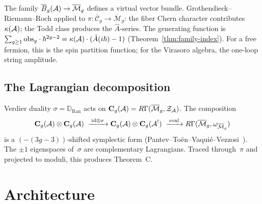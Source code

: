 The family $\overline{B}_g(\mathcal{A}) \to \overline{\mathcal{M}}_g$ defines a
virtual vector bundle.  Grothendieck--Riemann--Roch applied to
$\pi \colon \overline{\mathcal{C}}_g \to
\overline{\mathcal{M}}_g$: the fiber Chern character
contributes~$\kappa(\mathcal{A})$; the Todd class produces the
$\hat{A}$-series.  The generating function is
$\sum_{g \geq 1} \mathrm{obs}_g \cdot \hbar^{2g-2}
= \kappa(\mathcal{A}) \cdot (\hat{A}(i\hbar) - 1)$
(Theorem~\ref{thm:family-index}).  For a free fermion, this is the
spin partition function; for the Virasoro algebra, the one-loop
string amplitude.

\subsection{The Lagrangian decomposition}
\label{subsec:verdier-symplectic}

Verdier duality $\sigma = \mathbb{D}_{\operatorname{Ran}}$ acts on
$\mathbf{C}_g(\mathcal{A}) = R\Gamma(\overline{\mathcal{M}}_g,
\mathcal{Z}_{\mathcal{A}})$.  The composition
\[
\mathbf{C}_g(\mathcal{A}) \otimes \mathbf{C}_g(\mathcal{A})
\;\xrightarrow{\;\mathrm{id} \otimes \sigma\;}
\mathbf{C}_g(\mathcal{A}) \otimes \mathbf{C}_g(\mathcal{A}^!)
\;\xrightarrow{\;\mathrm{eval}\;}
R\Gamma(\overline{\mathcal{M}}_g,
\omega_{\overline{\mathcal{M}}_g})
\]
is a $(-(3g{-}3))$-shifted symplectic form
(Pantev--To\"en--Vaqui\'e--Vezzosi~\cite{PTVV13}).  The $\pm 1$
eigenspaces of~$\sigma$ are complementary Lagrangians.  Traced
through~$\pi$ and projected to moduli, this produces Theorem~C.


\section{Architecture}

